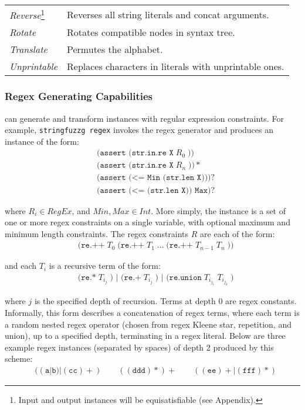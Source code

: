 \begin{table}[t]
\begin{subtable}{1\textwidth}
\begin{tabular}{l l}
            \textit{Reverse}\footnote{Input and output
            instances will be equisatisfiable (see Appendix).}
            & Reverses all string literals and concat arguments.\\
            \textit{Rotate}
            & Rotates compatible nodes in syntax tree.\\
            \textit{Translate}\footnotemark[4]
            & Permutes the alphabet.\\
            \textit{Unprintable}
            & Replaces characters in literals with unprintable ones.\\
            \bottomrule
        \end{tabular}
    \end{subtable}
\end{table}

\subsubsection{Regex Generating Capabilities}
\fuzzer{} can generate
and transform instances with regular expression constraints. For example,
\texttt{stringfuzzg regex} invokes the regex
generator and produces an instance of the form:
\begin{align*}
    & \texttt{(assert (str.in.re X}\; R_0\; \texttt{))} \\
    & \texttt{(assert (str.in.re X}\; R_n\; \texttt{))}* \\
    & \texttt{(assert (<= Min (str.len X)))}? \\
    & \texttt{(assert (<= (str.len X)) Max)}?
\end{align*}

where $R_i \in RegEx$, and $Min, Max \in Int$. More simply, the
instance is a set of one or more regex constraints on a single
variable, with optional maximum and minimum length constraints. The
regex constraints $R$ are each of the form:
\begin{align*}
    & \texttt{(re.++}\; T_0\; \texttt{(re.++}\; T_1\;
    \texttt{...}\; \texttt{(re.++}\; T_{n-1}\; T_n\; \texttt{))}
\end{align*}

and each $T_i$ is a recursive term of the form:
\begin{align*}
    & \texttt{(re.*}\; T_{i_j}\; \texttt{) | (re.+}\; T_{i_j}\;
    \texttt{) | (re.union}\; T_{i_{j_1}}\; T_{i_{j_2}}\; \texttt{)}
\end{align*}

where $j$ is the specified depth of recursion. Terms at depth 0 are
regex constants. Informally, this form describes a concatenation of
regex terms, where each term is a random nested regex operator (chosen from
regex Kleene star, repetition, and union), up to a specified depth,
terminating in a regex literal. Below are three example regex instances
(separated by spaces) of depth 2 produced by this scheme:
\begin{align*}
    & ((\texttt{a}|\texttt{b})|(\texttt{cc})+)\quad\quad
    ((\texttt{ddd})*)+\quad\quad ((\texttt{ee})+|(\texttt{fff})*)
\end{align*}

